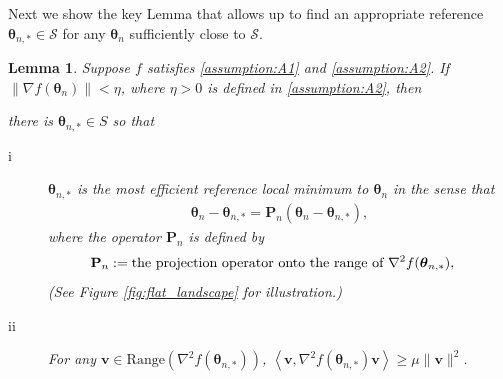\documentclass[11pt]{amsart}
\theoremstyle{plain}
\newtheorem{lemma}[theorem]{Lemma}
\theoremstyle{definition}
\theoremstyle{remark}
\def\bP{\mathbf{P}}
\def\param{\boldsymbol{\theta}}
\newcommand{\innp}[1]{\left\langle #1 \right\rangle}
\begin{document}
Next we show the key Lemma that allows up to find an appropriate reference $\param_{n,*}\in\mathcal{S}$ for any $\param_n$ sufficiently close to $\mathcal{S}.$

\begin{lemma}\label{lem:implications of A3}
Suppose $f$ satisfies \ref{assumption:A1} and \ref{assumption:A2}. If $\|\nabla f(\param_n)\|< \eta$, where $\eta>0$ is defined in \ref{assumption:A2}, then 

    there is $\param_{n,*}\in S$ so that 
    \begin{description}
        \item[i] 
            $\param_{n,*}$ is the most efficient reference local minimum to $\param_n$ in the sense that 
            \begin{align}\label{eq:choice_param_n_*}
                \param_n-\param_{n,*}=\bP_n(\param_n-\param_{n,*}),
            \end{align}
            where the operator $\bP_n$ is defined by
            \begin{align}\label{eq:def_Pn}
                \bP_n &:= \textup{the projection operator onto the range of $\nabla^2f(\param_{n,*})$},
            \end{align}
            (See Figure \ref{fig:flat_landscape} for illustration.)
        \item[ii] 
             For any $\mathbf{v}\in \text{Range}(\nabla^2f(\param_{n,*}))$, $\innp{\mathbf{v},\nabla^2f(\param_{n,*})\mathbf{v}}\geq \mu\|\mathbf{v}\|^2$.
    \end{description}
\end{lemma}
\end{document}
